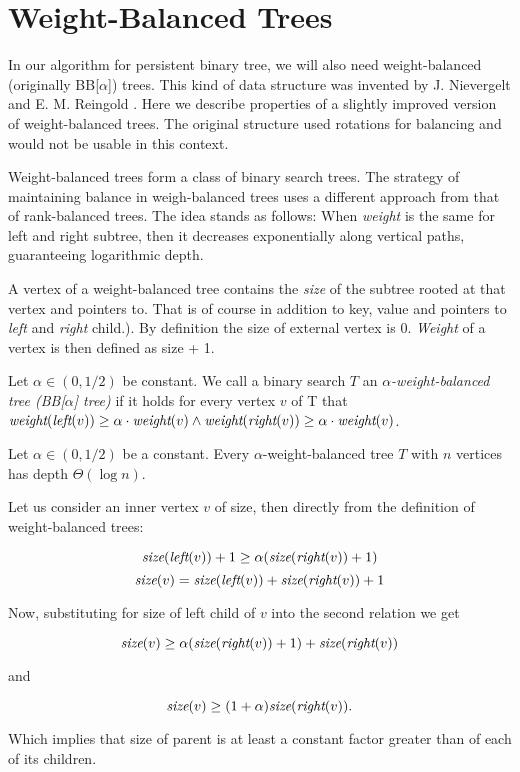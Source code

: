 \section{Weight-Balanced Trees}

In our algorithm for persistent binary tree, we will also need weight-balanced (originally BB[$\alpha$]) trees. This kind of data structure was invented by J. Nievergelt and E. M. Reingold \cite{weight-balanced}. Here we describe properties of a slightly improved version of weight-balanced trees. The original structure used rotations for balancing and would not be usable in this context.

Weight-balanced trees form a class of binary search trees. The strategy of maintaining balance in weigh-balanced trees uses a different approach from that of rank-balanced trees. The idea stands as follows: When \emph{weight} is the same for left and right subtree, then it decreases exponentially along vertical paths, guaranteeing logarithmic depth.

A vertex of a weight-balanced tree contains the {\em size} of the subtree rooted at that vertex and pointers to. That is of course in addition to key, value and pointers to {\em left} and {\em right} child.). By definition the size of external vertex is 0. {\em Weight} of a vertex is then defined as size + 1.

\begin{defn}
Let $\alpha \in (0,1/2)$ be constant. We call a binary search $T$ an {\em $\alpha$-weight-balanced tree (BB[$\alpha$] tree)} if it holds for every vertex $v$ of T that $\text{\it weight}(\text{\it left}(v)) \geq \alpha \cdot \text{\it weight}(v) \wedge \text{\it weight}(\text{\it right}(v)) \geq \alpha \cdot \text{\it weight}(v) $.
\end{defn}

\begin{prop}
Let $\alpha \in (0,1/2)$ be a constant. Every $\alpha$-weight-balanced tree $T$ with $n$ vertices has depth $\Theta(\log n)$. 
\end{prop}

\begin{myproof}
Let us consider an inner vertex $v$ of size, then directly from the definition of weight-balanced trees:

$$ \text{\it size}(\text{\it left}(v)) + 1 \geq \alpha (\text{\it size}(\text{\it right}(v))+1)$$
$$ \text{\it size}(v) = \text{\it size}(\text{\it left}(v)) + \text{\it size}(\text{\it right}(v)) + 1 $$

Now, substituting for size of left child of $v$ into the second relation we get

$$ \text{\it size}(v) \geq \alpha (\text{\it size}(\text{\it right}(v)) + 1) + \text{\it size}(\text{\it right}(v)) $$

and

$$ \text{\it size}(v) \geq (1+\alpha)\text{\it size}(\text{\it right}(v)).$$

Which implies that size of parent is at least a constant factor greater than of each of its children.
\end{myproof}

